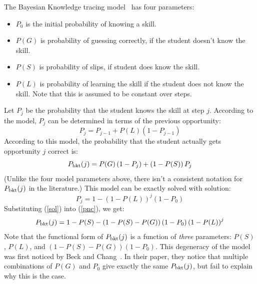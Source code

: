 \documentclass[11pt,letterpaper]{article}
\begin{document}
The Bayesian Knowledge tracing model~\cite{anderson} has four parameters:
%
\begin{itemize}
   \item $P_0$ is the initial probability of knowing a skill.
   \item $P(G)$ is probability of guessing correctly, if the student        
         doesn't know the skill.
   \item $P(S)$ is probability of slips, if student does know the skill.
   \item $P(L)$ is probability of learning the skill if the student 
         does not know the skill.  Note that this is assumed to 
         be constant over steps.
\end{itemize}
%
Let $P_j$ be the probability that the student knows the skill at 
step $j$. According to the model,  $P_j$ can
be determined in terms of the previous opportunity:
%
\begin{equation}
          P_j = P_{j-1} + P(L)\left(1-P_{j-1}\right)
\end{equation}
%
According to this model, the probability that the student actually gets
opportunity $j$ correct is:
%
\begin{equation}
        P_{\rm bkt}(j) = P(G)\left(1-P_j\right) + 
                     \left(1-P(S)\right) P_j \label{pnc}
\end{equation}
%
(Unlike the four model parameters above, there isn't a consistent
notation for $P_{\rm bkt}(j)$ in the literature.)
This model can be exactly solved with solution: 
%
\begin{equation}
            P_j = 1-\left(1-P(L)\right)^j\left(1-P_0\right)
	    \label{sol}
\end{equation}
%
%
Substituting (\ref{sol}) into (\ref{pnc}), we get:
%
\begin{equation}
         P_{\rm bkt}(j) = 1-P(S) -\left(1-P(S)-P(G)\right) \left(1-P_0\right)
                   \left(1-P(L)\right)^j \label{pncsoln}
\end{equation}
%
Note that the functional form of $P_{\rm bkt}(j)$ is a function of {\em three}
parameters:  $P(S)$, $P(L)$, and $\left(1-P(S)-P(G)\right) \left(1-P_0\right)$.
This degeneracy of the model was first noticed by Beck and 
Chang~\cite{beckchang}.  In their paper, they notice that multiple
combinations of $P(G)$ and $P_0$ give exactly the same $P_{\rm bkt}(j)$, but
fail to explain why this is the case.
\end{document}
